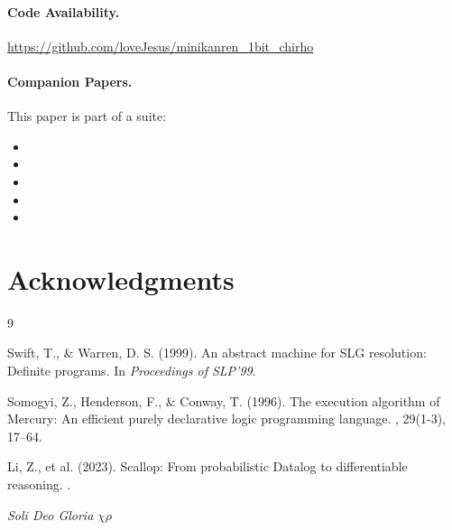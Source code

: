 \documentclass[11pt,a4paper]{article}
\begin{document}
\paragraph{Code Availability.}
\url{https://github.com/loveJesus/minikanren_1bit_chirho}

\paragraph{Companion Papers.}
This paper is part of a suite:
\begin{itemize}
  \item \paperA
  \item \paperB
  \item \paperC
  \item \paperE
  \item \paperF
\end{itemize}

\section*{Acknowledgments}

\standardacknowledgments


\begin{thebibliography}{9}

Swift, T., \& Warren, D. S. (1999).
\newblock An abstract machine for SLG resolution: Definite programs.
\newblock In {\em Proceedings of SLP'99}.

Somogyi, Z., Henderson, F., \& Conway, T. (1996).
\newblock The execution algorithm of Mercury: An efficient purely declarative
logic programming language.
, 29(1-3), 17--64.

Li, Z., et al. (2023).
\newblock Scallop: From probabilistic Datalog to differentiable reasoning.
.

\end{thebibliography}

\vspace{1em}
\begin{center}
\textit{Soli Deo Gloria} $\chi\rho$
\end{center}
\end{document}
